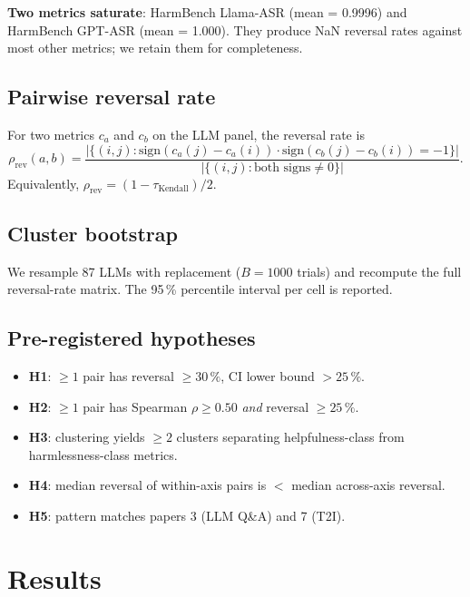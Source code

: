 \documentclass[10pt]{article}
\begin{document}
\textbf{Two metrics saturate}: HarmBench Llama-ASR (mean = 0.9996)
and HarmBench GPT-ASR (mean = 1.000). They produce NaN reversal
rates against most other metrics; we retain them for completeness.

\subsection{Pairwise reversal rate}

For two metrics $c_a$ and $c_b$ on the LLM panel, the reversal rate is
\begin{equation}
\rho_\text{rev}(a, b) =
\frac{|\{(i, j) : \mathrm{sign}(c_a(j) - c_a(i)) \cdot \mathrm{sign}(c_b(j) - c_b(i)) = -1\}|}
     {|\{(i, j) : \text{both signs} \neq 0\}|}.
\end{equation}
Equivalently, $\rho_\text{rev} = (1 - \tau_\text{Kendall}) / 2$.

\subsection{Cluster bootstrap}

We resample 87 LLMs with replacement ($B = 1000$ trials) and
recompute the full reversal-rate matrix. The 95\,\% percentile
interval per cell is reported.

\subsection{Pre-registered hypotheses}

\begin{itemize}
\item \textbf{H1}: $\geq 1$ pair has reversal $\geq 30\,\%$, CI lower
bound $> 25\,\%$.
\item \textbf{H2}: $\geq 1$ pair has Spearman $\rho \geq 0.50$
\emph{and} reversal $\geq 25\,\%$.
\item \textbf{H3}: clustering yields $\geq 2$ clusters separating
helpfulness-class from harmlessness-class metrics.
\item \textbf{H4}: median reversal of within-axis pairs is $<$ median
across-axis reversal.
\item \textbf{H5}: pattern matches papers 3 (LLM Q\&A) and 7 (T2I).
\end{itemize}

\section{Results}
\end{document}
